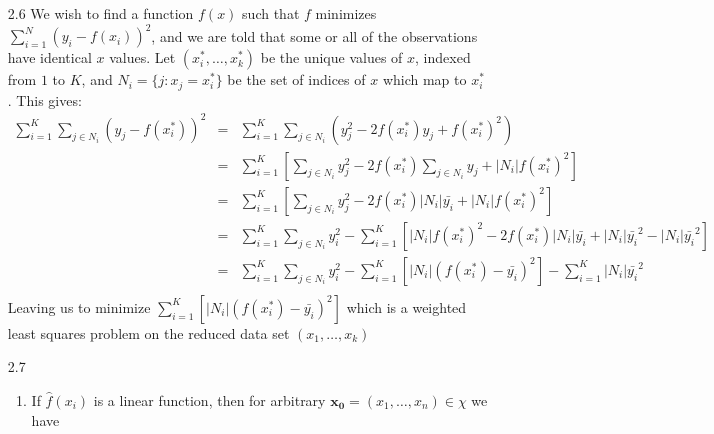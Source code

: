 \documentclass{article}
\begin{document}
\renewcommand{\vec}[1]{\mathbf{#1}}
\newcommand{\ovec}[1]{\mathbf{\Omega_{#1}}}
\newcommand{\normfront}[1]{(#1\pi)^{-\frac{1}{2}}}






\begin{enumerate}
  \item[2.6] We wish to find a function $f(x)$ such that $f$ minimizes $\sum\limits_{i=1}^N (y_i-f(x_i))^2$, and we are told that some or all of the observations have identical $x$ values. Let $(x_i^*,\dots,x_k^*)$ be the unique values of $x$, indexed from $1$ to $K$, and $N_i = \{j: x_j = x_i^*\}$ be the set of indices of $x$ which map to $x_i^*$. This gives:
  \begin{eqnarray*}
    \sum\limits_{i=1}^{K}\sum\limits_{j\in N_i}(y_j-f(x_i^*))^2 &=& \sum\limits_{i=1}^{K}\sum\limits_{j\in N_i}(y_j^2 - 2f(x_i^*)y_j + f(x_i^*)^2) \\
                                                               &=& \sum\limits_{i=1}^{K}\left[\sum\limits_{j\in N_i}y_j^2 - 2f(x_i^*)\sum\limits_{j\in N_i}y_j + |N_i|f(x_i^*)^2\right] \\
                                                               &=& \sum\limits_{i=1}^{K}\left[\sum\limits_{j\in N_i}y_j^2 - 2f(x_i^*)|N_i|\bar{y_i} + |N_i|f(x_i^*)^2\right] \\
                                                               &=& \sum\limits_{i=1}^{K}\sum\limits_{j\in N_i}y_i^2 - \sum\limits_{i=1}^{K}\left[|N_i|f(x_i^*)^2-2f(x_i^*)|N_i|\bar{y_i} +|N_i|\bar{y_i}^2 -|N_i|\bar{y_i}^2\right] \\
                                                               &=& \sum\limits_{i=1}^{K}\sum\limits_{j\in N_i}y_i^2 - \sum\limits_{i=1}^{K}\left[|N_i|(f(x_i^*)-\bar{y_i})^2\right] - \sum\limits_{i=1}^{K}|N_i|\bar{y_i}^2 \\
  \end{eqnarray*}
  Leaving us to minimize $\sum\limits_{i=1}^{K}\left[|N_i|(f(x_i^*)-\bar{y_i})^2\right]$ which is a weighted least squares problem on the reduced data set $(x_1,\dots,x_k)$
  \item[2.7]
    \begin{enumerate}
      \item If $\hat{f}(x_i)$ is a linear function, then for arbitrary $\vec{x_0}=(x_1,\dots,x_n)\in\chi$ we have

\end{enumerate}
\end{enumerate}
\end{document}
